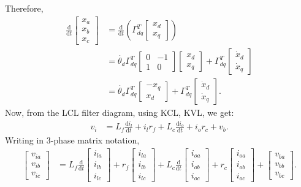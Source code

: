 Therefore,
\begin{align*}
	\frac{\text{d}}{\text{d}t}\begin{bmatrix}
	x_a\\x_b\\x_c
	\end{bmatrix} &= \frac{\text{d}}{\text{d}t}\left(\Gamma_{dq}^T \begin{bmatrix}
	x_d\\x_q
	\end{bmatrix}\right)\\
	&= \dot{\theta_d} \Gamma_{dq}^T \begin{bmatrix}
	0 & -1\\1 & 0
	\end{bmatrix}\begin{bmatrix}
	x_d\\x_q
	\end{bmatrix}+\Gamma_{dq}^T\begin{bmatrix}
	\dot{x}_d\\\dot{x}_q
	\end{bmatrix}\\
	&= \dot{\theta_d} \Gamma_{dq}^T\begin{bmatrix}
		-x_q\\x_d
	\end{bmatrix}+\Gamma_{dq}^T\begin{bmatrix}
	\dot{x}_d\\\dot{x}_q
	\end{bmatrix}.
\end{align*}
Now, from the LCL filter diagram, using KCL, KVL, we get:
\begin{align*}
	v_i &= L_f\frac{\text{d}i_l}{\text{d}t}+i_lr_f+L_c\frac{\text{d}i_o}{\text{d}t}+i_or_c+v_b.
\end{align*}
Writing in 3-phase matrix notation,
\begin{align*}
	\begin{bmatrix}
		v_{ia}\\v_{ib}\\v_{ic}
	\end{bmatrix} &= L_f\frac{\text{d}}{\text{d}t}\begin{bmatrix}
		i_{la}\\i_{lb}\\i_{lc}
	\end{bmatrix}+r_f\begin{bmatrix}
		i_{la}\\i_{lb}\\i_{lc}
	\end{bmatrix}+L_c\frac{\text{d}}{\text{d}t}\begin{bmatrix}
		i_{oa}\\i_{ob}\\i_{oc}
	\end{bmatrix}+r_c\begin{bmatrix}
		i_{oa}\\i_{ob}\\i_{oc}
	\end{bmatrix}+\begin{bmatrix}
		v_{ba}\\v_{bb}\\v_{bc}
	\end{bmatrix}.
\end{align*}
